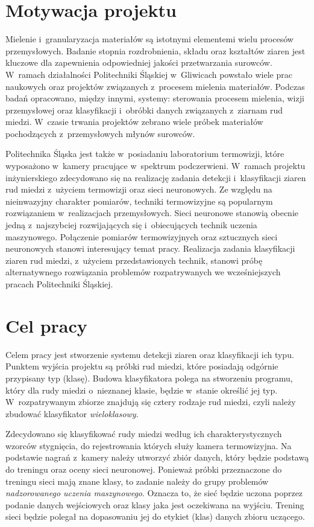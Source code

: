 \section{Motywacja projektu}
Mielenie i~granularyzacja materiałów są istotnymi elementemi wielu procesów
przemysłowych.
Badanie stopnia rozdrobnienia, składu oraz kształtów ziaren jest kluczowe
dla zapewnienia odpowiedniej jakości przetwarzania surowców.
W~ramach działalności Politechniki Śląskiej w~Gliwicach powstało wiele prac
naukowych oraz projektów związanych z~procesem mielenia materiałów.
Podczas badań opracowano, między innymi, systemy: sterowania
procesem mielenia, wizji przemysłowej oraz klasyfikacji i~obróbki
danych związanych z~ziarnam rud miedzi.
W~czasie trwania projektów zebrano wiele próbek materiałów pochodzących
z~przemysłowych młynów surowców.

Politechnika Śląska jest także w~posiadaniu laboratorium termowizji, które
wyposażono w~kamery pracujące w~spektrum podczerwieni.
W~ramach projektu inżynierskiego zdecydowano się na realizację zadania
detekcji i~klasyfikacji ziaren rud miedzi z~użyciem termowizji oraz sieci
neuronowych.
Ze względu na nieinwazyjny charakter pomiarów, techniki termowizyjne są
popularnym rozwiązaniem w~realizacjach przemysłowych.
Sieci neuronowe stanowią obecnie jedną z~najszybciej rozwijających się
i~obiecujących technik uczenia maszynowego.
Połączenie pomiarów termowizyjnych oraz sztucznych sieci neuronowych
stanowi interesujący temat pracy.
Realizacja zadania klasyfikacji ziaren rud miedzi, z~użyciem przedstawionych
technik, stanowi próbę alternatywnego rozwiązania problemów rozpatrywanych
we wcześniejszych pracach Politechniki Śląskiej.

\section{Cel pracy}
Celem pracy jest stworzenie systemu detekcji ziaren oraz klasyfikacji ich
typu.
Punktem wyjścia projektu są próbki rud miedzi, które posiadają odgórnie
przypisany typ (klasę).
Budowa klasyfikatora polega na stworzeniu programu, który
dla rudy miedzi o~nieznanej klasie, będzie w~stanie określić jej typ.
W~rozpatrywanym zbiorze znajdują się cztery rodzaje rud miedzi, czyli
należy zbudować klasyfikator \emph{wieloklasowy}.

Zdecydowano się klasyfikować rudy miedzi według ich charakterystycznych
wzorców stygnięcia, do rejestrowania których służy kamera termowizyjna.
Na podstawie nagrań z~kamery należy utworzyć zbiór danych, który będzie
podstawą do treningu oraz oceny sieci neuronowej.
Ponieważ próbki przeznaczone do treningu sieci mają znane klasy, 
to zadanie należy do grupy problemów \emph{nadzorowanego uczenia maszynowego}.
Oznacza to, że sieć będzie uczona poprzez podanie danych wejściowych
oraz klasy jaka jest oczekiwana na wyjściu.
Trening sieci będzie polegał na dopasowaniu jej do etykiet (klas) danych
zbioru uczącego.

